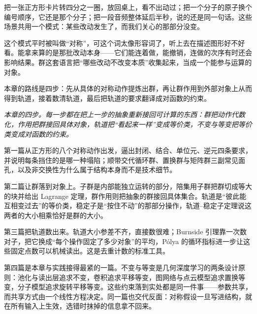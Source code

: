 把一张正方形卡片转四分之一圈，放回桌上，看不出动过；把一个分子的原子换个编号顺序，它还是那个分子；把一段音频整体延后半秒，说的还是同一句话。这些场景共用一个模式：某些改动发生了，而我们关心的那部分没变。

这个模式平时被叫做``对称''，可这个词太像形容词了，听上去在描述图形好不好看。能拿来算的是那批改动本身——它们能连着做，能撤销，连做的次序有时还会影响结果。群这套语言把``哪些改动不改变本质''收集起来，当成一个能参与运算的对象。

本章的路线是四步：先从具体的对称动作提炼出群，再让群作用到外部对象上从而得到轨道，接着数清轨道，最后把轨道的要求翻译成对函数的约束。

\begin{center}

\emph{本章的四步。每一步都在把上一步的抽象重新接回可计算的东西：群把动作代数化，作用把群接回具体对象，轨道把``看起来一样''变成等价类，不变与等变把等价类变成对函数的约束。}
\end{center}

第一篇从正方形的八个对称动作出发，逼出封闭、结合、单位元、逆元四条要求，并说明每条挡住的是哪一种塌陷；顺带交代循环群、置换群与矩阵群三副常见面孔，以及非交换性为什么属于结构本身而不是技术细节。

第二篇让群落到对象上。子群是内部能独立运转的部分，陪集用子群把群切成等大的块并给出 Lagrange 定理，群作用则把抽象的群接回具体集合。轨道是``彼此能互相变过去''的等价类，稳定子是``按住不动''的那部分操作，轨道--稳定子定理说这两者的大小相乘恰好是群的大小。

第三篇把轨道数出来。轨道大小参差不齐，直接数很难；Burnside 引理靠一次数对子，把它换成``每个操作固定了多少对象''的平均，Pólya 的循环指标进一步让这些固定点数可以机械读出。这是去重计数的标准工具。

第四篇是本章与实践接得最紧的一篇。不变与等变是几何深度学习的两条设计原则：池化与读出层追求不变，卷积追求平移等变，图网络与点云模型追求置换等变，分子模型追求旋转平移等变。这些约束落到实处都是同一件事——参数共享，而共享方式由一个线性方程决定。同一篇也交代反面：对称假设一旦写进结构，就在所有输入上生效，选错时抹掉的信息拿不回来。

